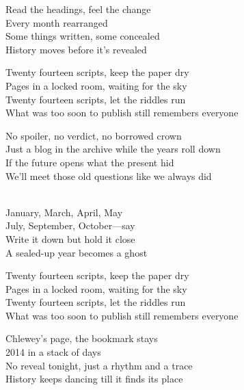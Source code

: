 \begin{lyrics}
Read the headings, feel the change\\
Every month rearranged\\
Some things written, some concealed\\
History moves before it's revealed

Twenty fourteen scripts, keep the paper dry\\
Pages in a locked room, waiting for the sky\\
Twenty fourteen scripts, let the riddles run\\
What was too soon to publish still remembers everyone

No spoiler, no verdict, no borrowed crown\\
Just a blog in the archive while the years roll down\\
If the future opens what the present hid\\
We'll meet those old questions like we always did

\\
January, March, April, May\\
July, September, October—say\\
Write it down but hold it close\\
A sealed-up year becomes a ghost

Twenty fourteen scripts, keep the paper dry\\
Pages in a locked room, waiting for the sky\\
Twenty fourteen scripts, let the riddles run\\
What was too soon to publish still remembers everyone

Chlewey's page, the bookmark stays\\
2014 in a stack of days\\
No reveal tonight, just a rhythm and a trace\\
History keeps dancing till it finds its place
\end{lyrics}

